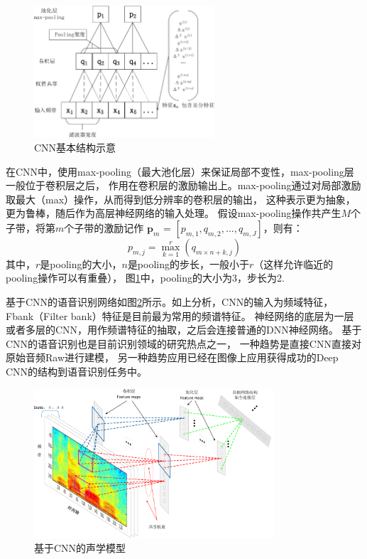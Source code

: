 \begin{figure}[htbp]
\centering
\includegraphics[width=0.6\textwidth]{figures/chapter3/cnn-crop}
\caption{CNN基本结构示意}
\label{fig:cnn}
\end{figure}

在CNN中，使用max-pooling（最大池化层）来保证局部不变性，max-pooling层一般位于卷积层之后，
作用在卷积层的激励输出上。max-pooling通过对局部激励取最大（max）操作，从而得到低分辨率的卷积层的输出，
这种表示更为抽象，更为鲁棒，随后作为高层神经网络的输入处理。
假设max-pooling操作共产生$M$个子带，将第$m$个子带的激励记作
$\textbf{p}_m$ = $[p_{m,1}, q_{m,2}, ..., q_{m, J}]$，则有：
\begin{equation}
{p_{m,j}} = \mathop {\max }\limits_{k = 1}^r ({q_{m \times n + k,j}})
\end{equation}
其中，$r$是pooling的大小，$n$是pooling的步长，一般小于$r$（这样允许临近的pooling操作可以有重叠），
图\ref{fig:cnn}中，pooling的大小为3，步长为2.

基于CNN的语音识别网络如图\ref{fig:cnnasr}所示。如上分析，CNN的输入为频域特征，
Fbank（Filter bank）特征是目前最为常用的频谱特征。
神经网络的底层为一层或者多层的CNN，用作频谱特征的抽取，之后会连接普通的DNN神经网络。
基于CNN的语音识别也是目前识别领域的研究热点之一，
一种趋势是直接CNN直接对原始音频Raw进行建模，
另一种趋势应用已经在图像上应用获得成功的Deep CNN的结构到语音识别任务中。


\begin{figure}[htbp]
\centering
\includegraphics[width=0.8\textwidth]{figures/chapter3/cnnasr-crop}
\caption{基于CNN的声学模型}
\label{fig:cnnasr}
\end{figure}

